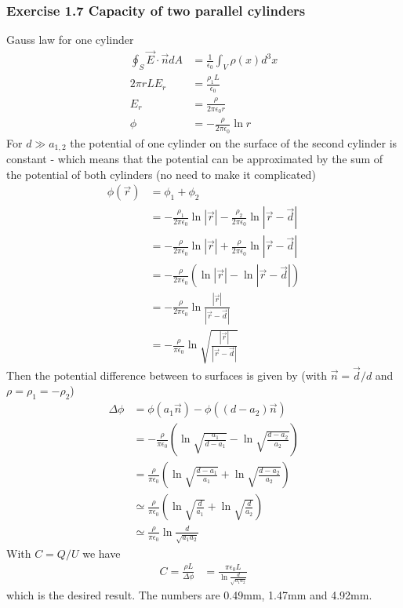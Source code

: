 \documentclass[10pt,a4paper]{article}
\theoremstyle{definition}
\begin{document}
\subsubsection{Exercise 1.7 Capacity of two parallel cylinders}Gauss law for one cylinder
\begin{align}
\oint_S\vec{E}\cdot\vec{n}dA&=\frac{1}{\epsilon_0}\int_V\rho(x)d^3x\\
2\pi rLE_r&=\frac{\rho_{1} L}{\epsilon_0}\\
E_r&=\frac{\rho}{2\pi\epsilon_0r}\\
\phi&=-\frac{\rho}{2\pi\epsilon_0}\ln r
\end{align}
For $d\gg a_{1,2}$ the potential of one cylinder on the surface of the second cylinder is constant - which means that the potential can be approximated by the sum of the potential of both cylinders (no need to make it complicated)
\begin{align}
\phi(\vec{r})&=\phi_1+\phi_2\\
&=-\frac{\rho_{1}}{2\pi\epsilon_0}\ln |\vec{r}|-\frac{\rho_{2}}{2\pi\epsilon_0}\ln |\vec{r}-\vec{d}|\\
&=-\frac{\rho}{2\pi\epsilon_0}\ln |\vec{r}|+\frac{\rho}{2\pi\epsilon_0}\ln |\vec{r}-\vec{d}|\\
&=-\frac{\rho}{2\pi\epsilon_0}\left(\ln |\vec{r}|-\ln |\vec{r}-\vec{d}|\right)\\
&=-\frac{\rho}{2\pi\epsilon_0}\ln \frac{|\vec{r}|}{|\vec{r}-\vec{d}|}\\
&=-\frac{\rho}{\pi\epsilon_0}\ln \sqrt{\frac{|\vec{r}|}{|\vec{r}-\vec{d}|}}
\end{align}
Then the potential difference between to surfaces is given by (with $\vec{n}=\vec{d}/d$ and $\rho=\rho_1=-\rho_2$)
\begin{align}
\Delta\phi&=\phi(a_1\vec{n})-\phi((d-a_2)\vec{n})\\
&=-\frac{\rho}{\pi\epsilon_0}\left(\ln \sqrt{\frac{a_1}{d-a_1}}-\ln \sqrt{\frac{d-a_2}{a_2}}\right)\\
&=\frac{\rho}{\pi\epsilon_0}\left(\ln \sqrt{\frac{d-a_1}{a_1}}+\ln \sqrt{\frac{d-a_2}{a_2}}\right)\\
&\simeq\frac{\rho}{\pi\epsilon_0}\left(\ln \sqrt{\frac{d}{a_1}}+\ln \sqrt{\frac{d}{a_2}}\right)\\
&\simeq\frac{\rho}{\pi\epsilon_0}\ln \frac{d}{\sqrt{a_1a_2}}
\end{align}
With $C=Q/U$ we have
\begin{align}
C=\frac{\rho L}{\Delta\phi}&=\frac{\pi\epsilon_0L}{\ln \frac{d}{\sqrt{a_1a_2}}}
\end{align}
which is the desired result. The numbers are 0.49mm, 1.47mm and 4.92mm.
\end{document}
